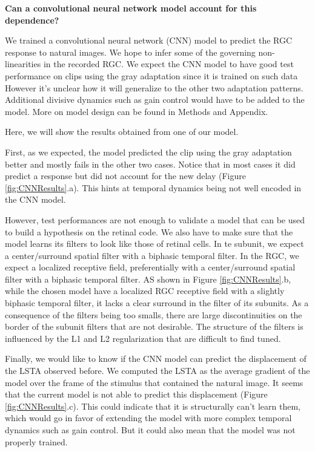 \textbf{Can a convolutional neural network model account for this dependence?}

We trained a convolutional neural network (CNN) model to predict the RGC
response to natural images. We hope to infer some of the governing
non-linearities in the recorded RGC. We expect the CNN model to have
good test performance on clips using the gray adaptation since it is trained on
such data However it's unclear how it will generalize to the other two
adaptation patterns. Additional divisive dynamics such as gain control would
have to be added to the model. More on model design can be found in Methods and Appendix.

Here, we will show the results obtained from one of our model.

First, as we expected, the model predicted the clip using the gray adaptation
better and mostly fails in the other two cases. Notice that in most cases it
did predict a response but did not account for the new delay (Figure \ref{fig:CNNResults}.a).
This hints at temporal dynamics being not well encoded in the CNN model.

However, test performances are not enough to validate a model that can be used
to build a hypothesis on the retinal code. We also have to make sure that the
model learns its filters to look like those of retinal cells. In te subunit,
we expect a center/surround spatial filter with a biphasic temporal filter. In
the RGC, we expect a localized receptive field, preferentially with a
center/surround spatial filter with a biphasic temporal filter. AS shown in
Figure \ref{fig:CNNResults}.b, while the chosen model have a localized RGC receptive field
with a slightly biphasic temporal filter, it lacks a clear surround in the filter
of its subunits. As a consequence of the filters being too smalls, there are
large discontinuities on the border of the subunit filters that are not
desirable.
The structure of the filters is influenced by the L1 and L2 regularization that are difficult to find tuned.

Finally, we would like to know if the CNN model can predict the displacement of
the LSTA observed before. We computed the LSTA as the average gradient of the
model over the frame of the stimulus that contained the natural image. It seems
that the current model is not able to predict this displacement (Figure \ref{fig:CNNResults}.c). This could
indicate that it is structurally can't learn them, which would go in favor of
extending the model with more complex temporal dynamics such as gain control.
But it could also mean that the model was not properly trained.

